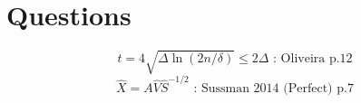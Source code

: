 \documentclass[10pt]{article}
\begin{document}
\section{Questions}
\begin{equation*}
t = 4 \sqrt{\Delta \ln (2n/\delta)} \leq 2\Delta \mbox{   : Oliveira p.12}
\end{equation*}
\begin{equation*}
\hat{X} = A\hat{V}\hat{S}^{-1/2} \mbox{   : Sussman 2014 (Perfect) p.7}
\end{equation*}
\end{document}
